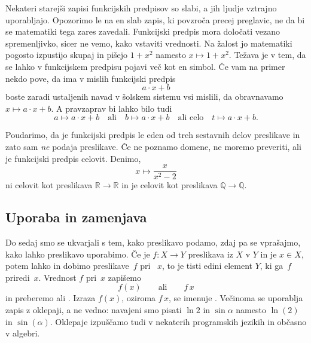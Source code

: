 Nekateri starejši zapisi funkcijskih predpisov so slabi, a jih ljudje vztrajno
uporabljajo. Opozorimo le na en slab zapis, ki povzroča precej preglavic, ne da bi se
matematiki tega zares zavedali. Funkcijski predpis mora določati vezano spremenljivko,
sicer ne vemo, kako vstaviti vrednosti. Na žalost jo matematiki pogosto izpustijo skupaj
in pišejo $1 + x^2$ namesto $x \mapsto 1 + x^2$.
%
Težava je v tem, da se lahko v funkcijskem predpisu pojavi več kot en simbol. Če vam na primer nekdo pove, da ima v mislih funkcijski predpis
%
\begin{equation*}
  a \cdot x + b
\end{equation*}
%
boste zaradi ustaljenih navad v šolskem sistemu vsi mislili, da obravnavamo $x \mapsto a \cdot x + b$.
%
A pravzaprav bi lahko bilo tudi
%
\begin{equation*}
  a \mapsto a \cdot x + b
  \quad\text{ali}\quad
  b \mapsto a \cdot x + b
  \quad\text{ali celo}\quad
  t \mapsto a \cdot x + b.
\end{equation*}

Poudarimo, da je funkcijski predpis le eden od treh sestavnih delov preslikave in zato sam \emph{ne} podaja preslikave.
%
Če ne poznamo domene, ne moremo preveriti, ali je funkcijski predpis celovit. Denimo,
%
\begin{equation*}
  x \mapsto \frac{x}{x^2 - 2}
\end{equation*}
%
ni celovit kot preslikava $\mathbb{R} \to \mathbb{R}$ in je celovit kot preslikava $\mathbb{Q} \to \mathbb{Q}$.


\subsection{Uporaba in zamenjava}
\label{sec:uporaba-in-zamenjava}

Do sedaj smo se ukvarjali s tem, kako preslikavo podamo, zdaj pa se vprašajmo, kako lahko
preslikavo uporabimo. Če je $f : X \to Y$ preslikava iz $X$ v $Y$ in je $x \in X$, potem
lahko  in dobimo  preslikave~$f$ pri
~$x$, to je tisti edini element $Y$, ki ga~$f$ priredi~$x$. Vrednost $f$
pri~$x$ zapišemo
%
\begin{equation*}
  f(x)
  \qquad\text{ali}\qquad
  f\,x
\end{equation*}
%
in preberemo  ali . Izraza $f(x)$, oziroma $f\,x$, se imenuje
. Večinoma se uporablja zapis z oklepaji, a ne vedno: navajeni smo pisati
$\ln 2$ in $\sin \alpha$ namesto $\ln(2)$ in $\sin(\alpha)$. Oklepaje izpuščamo tudi v
nekaterih programskih jezikih in občasno v algebri.

